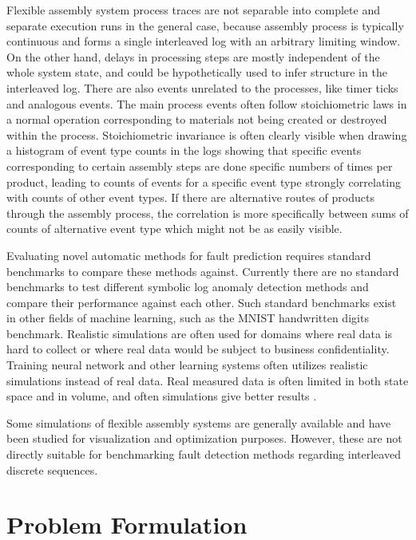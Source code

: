 \documentclass[journal]{IEEEtran}
\begin{document}
Flexible assembly system process traces are not separable into complete and separate execution runs in the general case, because assembly process is typically continuous and
forms a single interleaved log with an arbitrary limiting window.
On the other hand, delays in processing steps are mostly independent of the whole system state, and could be hypothetically used to infer structure in the interleaved log.
There are also events unrelated to the processes, like timer ticks and analogous events. The main process events often follow stoichiometric laws in a normal operation corresponding to materials
not being created or destroyed within the process. Stoichiometric invariance is often clearly visible when drawing a histogram of event type counts in the logs showing that specific events corresponding to certain
assembly steps are done specific numbers of times per product, leading to counts of events for a specific event type strongly correlating with counts of other event types. If there are alternative routes of products
through the assembly process, the correlation is more specifically between sums of counts of alternative event type which might not be as easily visible.

Evaluating novel automatic methods for fault prediction requires standard benchmarks to compare these methods against. Currently there are no standard benchmarks to test
different symbolic log anomaly detection methods and compare their performance against each other. Such standard benchmarks exist in other fields of machine learning,
such as the MNIST handwritten digits benchmark\cite{lecun-mnisthandwrittendigit-2010}. Realistic simulations are often used\cite{jager2014assessing} for domains where
real data is hard to collect or where real data would be subject to business confidentiality. Training neural network and other learning systems often utilizes realistic
simulations instead of real data\cite{weston2014memory}. Real measured data is often limited in both state space and in volume,
and often simulations give better results \cite{duch2005artificial}.

Some simulations of flexible assembly systems are generally available\cite{giulio}\cite{el1989simulation}\cite{donath1988flexible} and have been studied for visualization and optimization purposes.
However, these are not directly suitable for benchmarking fault detection methods regarding interleaved discrete sequences.

\section{Problem Formulation}
\end{document}
